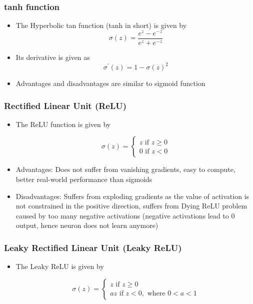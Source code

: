 \documentclass{article}
\theoremstyle{plain}
\theoremstyle{definition}
\begin{document}
\subsubsection{tanh function}
\begin{itemize}
    \item The Hyperbolic tan function (tanh in short) is given by
    \begin{equation*}
        \sigma(z) = \frac{e^z - e^{-z}}{e^z + e^{-z}}
    \end{equation*}
    
    \item Its derivative is given as
    \begin{equation*}
        \sigma^{\prime}(z) = 1 - \sigma(z)^2
    \end{equation*}
    
    \item Advantages and disadvantages are similar to sigmoid function
\end{itemize}

\subsubsection{Rectified Linear Unit (ReLU)}
\begin{itemize}
    \item The ReLU function is given by
    
    \begin{equation*}
        \sigma(z) = \begin{cases}
            z \text{ if } z \ge 0 \\
            0 \text{ if } z < 0
        \end{cases}
    \end{equation*}
    
    \item Advantages: Does not suffer from vanishing gradients, easy to compute, better real-world performance than sigmoids
    
    \item Disadvantages: Suffers from exploding gradients as the value of activation is not constrained in the positive direction, suffers from Dying ReLU problem caused by too many negative activations (negative activations lead to 0 output, hence neuron does not learn anymore)
\end{itemize}

\subsubsection{Leaky Rectified Linear Unit (Leaky ReLU)}
\begin{itemize}
    \item The Leaky ReLU is given by
    
    \begin{equation*}
        \sigma(z) = \begin{cases}
            z \text{ if } z \ge 0 \\
            a z \text{ if } z < 0, \text{ where } 0 < a < 1
        \end{cases}
    \end{equation*}
\end{itemize}
\end{document}
